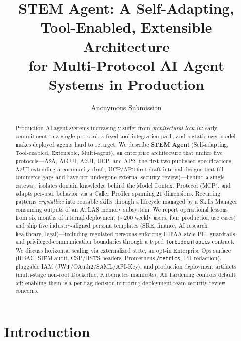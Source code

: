 \documentclass[11pt]{article}
\title{STEM Agent: A Self-Adapting, Tool-Enabled, Extensible Architecture\\
for Multi-Protocol AI Agent Systems in Production}
\author{Anonymous Submission}
\begin{document}
\maketitle

\begin{abstract}
Production AI agent systems increasingly suffer from \emph{architectural lock-in}: early commitment to a single protocol, a fixed tool-integration path, and a static user model makes deployed agents hard to retarget. We describe \textbf{STEM Agent} (Self-adapting, Tool-enabled, Extensible, Multi-agent), an enterprise architecture that unifies five protocols---A2A, AG-UI, A2UI, UCP, and AP2 (the first two published specifications, A2UI extending a community draft, UCP/AP2 first-draft internal designs that fill commerce gaps and have not undergone external security review)---behind a single gateway, isolates domain knowledge behind the Model Context Protocol (MCP), and adapts per-user behavior via a Caller Profiler spanning 21 dimensions. Recurring patterns \emph{crystallize} into reusable skills through a lifecycle managed by a Skills Manager consuming outputs of an ATLAS memory subsystem. We report operational lessons from six months of internal deployment ($\sim$200 weekly users, four production use cases) and ship five industry-aligned persona templates (SRE, finance, AI research, healthcare, legal)---including regulated personas enforcing HIPAA-style PHI guardrails and privileged-communication boundaries through a typed \texttt{forbiddenTopics} contract. We discuss horizontal scaling via externalized state, an opt-in Enterprise Ops surface (RBAC, SIEM audit, CSP/HSTS headers, Prometheus \texttt{/metrics}, PII redaction), pluggable IAM (JWT/OAuth2/SAML/API-Key), and production deployment artifacts (multi-stage non-root Dockerfile, Kubernetes manifests). All hardening controls default off; enabling them is a per-flag decision mirroring deployment-team security-review concerns.
\end{abstract}

\section{Introduction}
\label{sec:intro}
\end{document}
